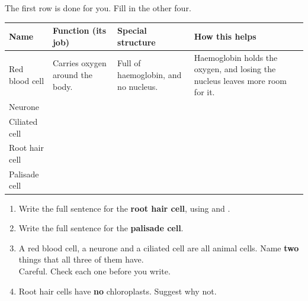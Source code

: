 \documentclass[12pt,a4paper]{article}
\begin{document}
\noindent The first row is done for you. Fill in the other four.

\vspace{8pt}
\noindent\small
\begin{tabularx}{\textwidth}{|p{2.5cm}|>{\raggedright\arraybackslash}p{3.2cm}|>{\raggedright\arraybackslash}p{3.2cm}|>{\raggedright\arraybackslash}X|}
  \hline
  \textbf{Name} & \textbf{Function (its job)} & \textbf{Special structure} &
  \textbf{How this helps} \\
  \hline
  Red blood cell \rule[-0.5em]{0pt}{1.6em} & Carries oxygen around the body. &
  Full of haemoglobin, and no nucleus. &
  Haemoglobin holds the oxygen, and losing the nucleus leaves more room for it. \\
  \hline
  Neurone \rule[-2.6em]{0pt}{3.6em} & & & \\
  \hline
  Ciliated cell \rule[-2.6em]{0pt}{3.6em} & & & \\
  \hline
  Root hair cell \rule[-2.6em]{0pt}{3.6em} & & & \\
  \hline
  Palisade cell \rule[-2.6em]{0pt}{3.6em} & & & \\
  \hline
\end{tabularx}
\normalsize


\begin{enumerate}[label=\arabic*., itemsep=12pt]

  \item Write the full sentence for the \textbf{root hair cell}, using
         and .

  \item Write the full sentence for the \textbf{palisade cell}.

  \item A red blood cell, a neurone and a ciliated cell are all animal cells. Name
        \textbf{two} things that all three of them have.\\
        {\small\color{black!60}Careful. Check each one before you write.}

  \item Root hair cells have \textbf{no} chloroplasts. Suggest why not.

\end{enumerate}

\end{document}
